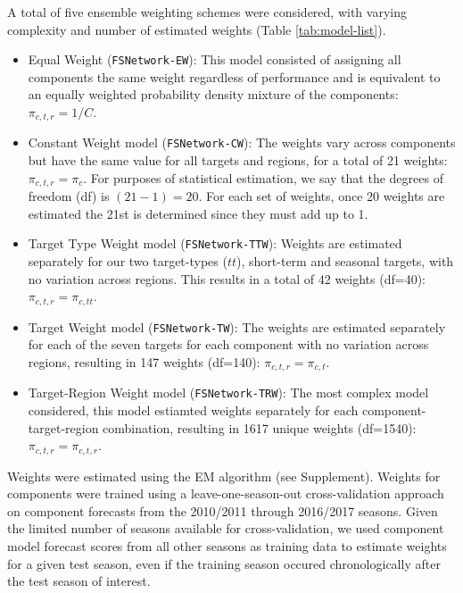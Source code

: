 \documentclass{article}\usepackage[]{graphicx}\usepackage[]{color}
\begin{document}
A total of five ensemble weighting schemes were considered, with varying complexity and number of estimated weights (Table \ref{tab:model-list}).
\begin{itemize}
\item 
Equal Weight ({\tt FSNetwork-EW}): This model consisted of assigning all components the same weight regardless of performance and is equivalent to an equally weighted probability density mixture of the components: $\pi_{c,t,r} = 1/C$. 

\item
Constant Weight model ({\tt FSNetwork-CW}): The weights vary across components but have the same value for all targets and regions, for a total of 21 weights: $\pi_{c,t,r} = \pi_c$. For purposes of statistical estimation, we say that the degrees of freedom (df) is $(21-1)=20$. For each set of weights, once 20 weights are estimated the 21st is determined since they must add up to 1.

\item
Target Type Weight model ({\tt FSNetwork-TTW}): Weights are estimated separately for our two target-types ($tt$), short-term and seasonal targets, with no variation across regions. This results in a total of 42 weights (df=40): $\pi_{c,t,r} = \pi_{c,tt}$. 

\item
Target Weight model ({\tt FSNetwork-TW}): The weights are estimated separately for each of the seven targets for each component with no variation across regions, resulting in 147 weights (df=140): $\pi_{c,t,r} = \pi_{c,t}$.

\item
Target-Region Weight model ({\tt FSNetwork-TRW}): The most complex model considered, this model estiamted weights separately for each component-target-region combination, resulting in 1617 unique weights (df=1540): $\pi_{c,t,r} = \pi_{c,t,r}$.

\end{itemize}

Weights were estimated using the EM algorithm (see Supplement). Weights for components were trained using a leave-one-season-out cross-validation approach on component forecasts from the 2010/2011 through 2016/2017 seasons. Given the limited number of seasons available for cross-validation, we used component model forecast scores from all other seasons as training data to estimate weights for a given test season, even if the training season occured chronologically after the test season of interest. 
\end{document}
